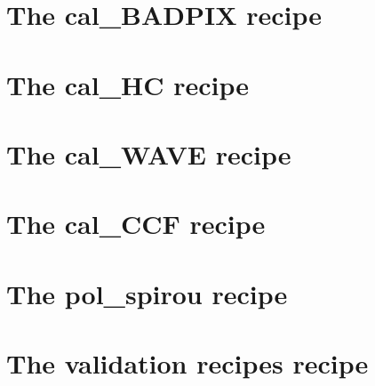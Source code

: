 \section{The cal\_BADPIX recipe}
\label{ch:the_recipes:cal_BADPIX_spirou}



\section{The cal\_HC recipe}
\label{ch:the_recipes:cal_HC_E2DS_spirou}



\section{The cal\_WAVE recipe}
\label{ch:the_recipes:cal_WAVE_E2DS_spirou}



\section{The cal\_CCF recipe}
\label{ch:the_recipes:cal_CCF_E2DS_spirou}


\section{The pol\_spirou recipe}
\label{ch:the_recipes:pol_spirou}


\section{The validation recipes recipe}
\label{ch:the_recipes:cal_validate_spirou}
